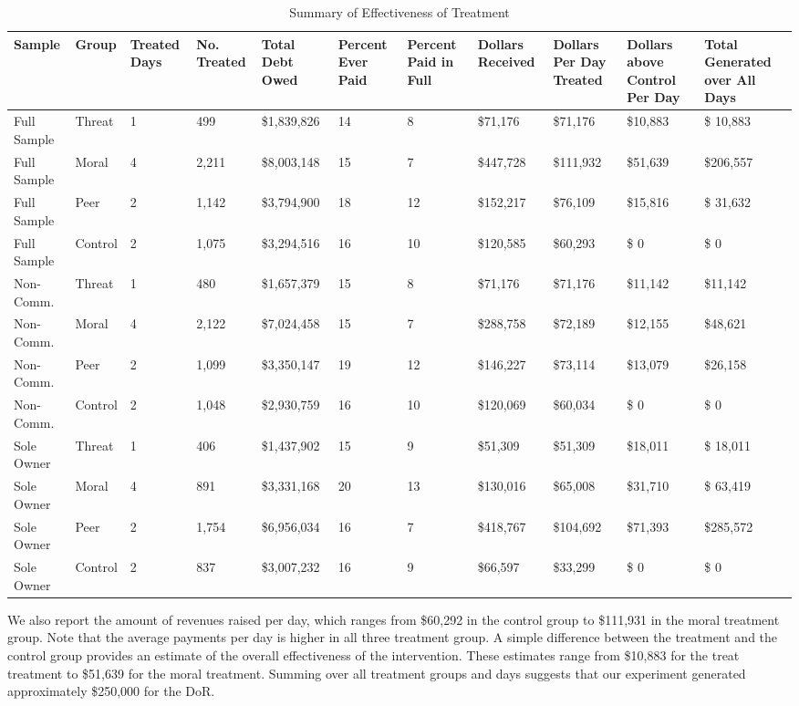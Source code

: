 \documentclass[12pt,titlepage]{article}
\begin{document}
\begin{sidewaystable}[htbp]
\caption{Summary of Effectiveness of Treatment}\label{summary}
\centering
\begin{tabular}{p{2.3cm}|p{1.3cm}|p{1.3cm}|p{1.3cm}|p{2.0cm}|p{1.4cm}|p{1.4cm}|p{1.4cm}|p{1.4cm}|p{1.4cm}|p{1.6cm}}
  \hline
Sample & Group & Treated Days & No. Treated & Total Debt Owed & Percent Ever Paid & Percent Paid in Full & Dollars Received & Dollars Per Day Treated & Dollars above Control Per Day & Total Generated over All Days \\ 
  \hline
Full Sample & Threat & 1 & 499 & \$1,839,826 & 14 &  8 & \$71,176 & \$71,176 & \$10,883 & \$ 10,883 \\ 
Full Sample & Moral & 4 & 2,211 & \$8,003,148 & 15 &  7 & \$447,728 & \$111,932 & \$51,639 & \$206,557 \\ 
Full Sample & Peer & 2 & 1,142 & \$3,794,900 & 18 & 12 & \$152,217 & \$76,109 & \$15,816 & \$ 31,632 \\ 
Full Sample & Control & 2 & 1,075 & \$3,294,516 & 16 & 10 & \$120,585 & \$60,293 & \$     0 & \$      0 \\ 
\hline
Non-Comm. & Threat & 1 & 480 & \$1,657,379 & 15 &  8 & \$71,176 & \$71,176 & \$11,142 & \$11,142 \\ 
Non-Comm. & Moral & 4 & 2,122 & \$7,024,458 & 15 &  7 & \$288,758 & \$72,189 & \$12,155 & \$48,621 \\ 
Non-Comm. & Peer & 2 & 1,099 & \$3,350,147 & 19 & 12 & \$146,227 & \$73,114 & \$13,079 & \$26,158 \\ 
Non-Comm. & Control & 2 & 1,048 & \$2,930,759 & 16 & 10 & \$120,069 & \$60,034 & \$     0 & \$     0 \\ 
\hline
Sole Owner & Threat & 1 & 406 & \$1,437,902 & 15 &  9 & \$51,309 & \$51,309 & \$18,011 & \$ 18,011 \\ 
Sole Owner & Moral & 4 & 891 & \$3,331,168 & 20 & 13 & \$130,016 & \$65,008 & \$31,710 & \$ 63,419 \\ 
Sole Owner & Peer & 2 & 1,754 & \$6,956,034 & 16 &  7 & \$418,767 & \$104,692 & \$71,393 & \$285,572 \\ 
Sole Owner & Control & 2 & 837 & \$3,007,232 & 16 &  9 & \$66,597 & \$33,299 & \$     0 & \$      0 \\ 
\hline
\end{tabular}
\label{table:effect}
\end{sidewaystable}

We also report the amount of revenues raised per day, which ranges
from \$60,292 in the control group to \$111,931 in the moral treatment
group. Note that the average payments per day is higher in all three
treatment group. A simple difference between the treatment and the
control group provides an estimate of the overall effectiveness of the
intervention. These estimates range from \$10,883 for the treat
treatment to \$51,639 for the moral treatment. Summing over all
treatment groups and days suggests that our experiment generated
approximately \$250,000 for the DoR.
\end{document}
